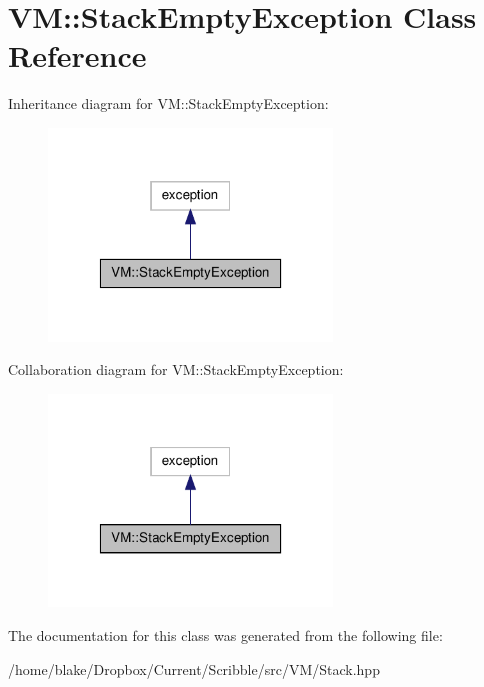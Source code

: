 \hypertarget{class_v_m_1_1_stack_empty_exception}{\section{V\-M\-:\-:Stack\-Empty\-Exception Class Reference}
\label{class_v_m_1_1_stack_empty_exception}
}


Inheritance diagram for V\-M\-:\-:Stack\-Empty\-Exception\-:\nopagebreak
\begin{figure}[H]
\begin{center}
\leavevmode
\includegraphics[width=214pt]{class_v_m_1_1_stack_empty_exception__inherit__graph}
\end{center}
\end{figure}


Collaboration diagram for V\-M\-:\-:Stack\-Empty\-Exception\-:\nopagebreak
\begin{figure}[H]
\begin{center}
\leavevmode
\includegraphics[width=214pt]{class_v_m_1_1_stack_empty_exception__coll__graph}
\end{center}
\end{figure}


The documentation for this class was generated from the following file\-:\begin{DoxyCompactItemize}
\item 
/home/blake/\-Dropbox/\-Current/\-Scribble/src/\-V\-M/Stack.\-hpp\end{DoxyCompactItemize}
